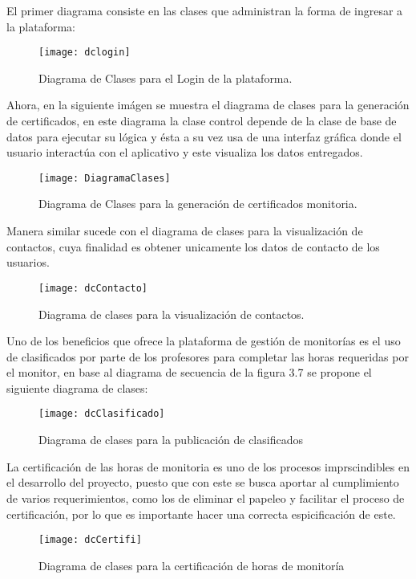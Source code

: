 El primer diagrama consiste en las clases que administran la forma de ingresar a la plataforma:

\begin{figure}[H]
	\centering
	\texttt{[image: dclogin]}
    \centering
    \caption{Diagrama de Clases para el Login de la plataforma.}
	\label{fig:dClaLogin}
\end{figure}

\newpage
Ahora, en la siguiente imágen se muestra el diagrama de clases para la generación de certificados, en este diagrama la clase control depende de la clase de base de datos para ejecutar su lógica y ésta a su vez usa de una interfaz gráfica donde el usuario interactúa con el aplicativo y este visualiza los datos entregados.

\begin{figure}[H]
	\centering
	\texttt{[image: DiagramaClases]}
    \centering
    \caption{Diagrama de Clases para la generación de certificados monitoria.}
	\label{fig:dClaCertificado}
\end{figure}

\newpage
Manera similar sucede con el diagrama de clases para la visualización de contactos, cuya finalidad es obtener unicamente los datos de contacto de los usuarios.
\begin{figure}[H]
	\centering
	\texttt{[image: dcContacto]}
    \centering
    \caption{Diagrama de clases para la visualización de contactos.}
	\label{fig:dClaContacto}
\end{figure}
\newpage
\clearpage
Uno de los beneficios que ofrece la plataforma de gestión de monitorías es el uso de clasificados por parte de los profesores para completar las horas requeridas por el monitor, en base al diagrama de secuencia de la figura 3.7 se propone el siguiente diagrama de clases:

\begin{figure}[H]
	\centering
	\texttt{[image: dcClasificado]}
    \centering
    \caption{Diagrama de clases para la publicación de clasificados}
	\label{fig:dClaClasificado}
\end{figure}
\clearpage
La certificación de las horas de monitoria es uno de los procesos imprscindibles en el desarrollo del proyecto, puesto que con este se busca aportar al cumplimiento de varios requerimientos, como los de eliminar el papeleo y facilitar el proceso de certificación, por lo que es importante hacer una correcta espicificación de este.
\begin{figure}[H]
	\centering
	\texttt{[image: dcCertifi]}
    \centering
    \caption{Diagrama de clases para la certificación de horas de monitoría}
	\label{fig:dClaCertifi}
\end{figure}

